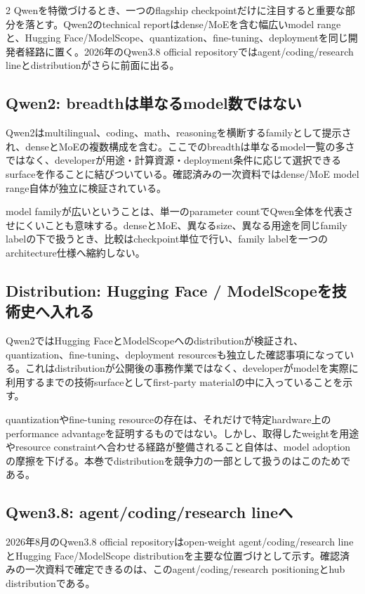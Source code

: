 \documentclass[lualatex,a4paper,10pt]{jlreq}
\begin{document}
\begin{multicols}{2}
\raggedcolumns
Qwenを特徴づけるとき、一つのflagship checkpointだけに注目すると重要な部分を落とす。Qwen2のtechnical reportはdense/MoEを含む幅広いmodel rangeと、Hugging Face/ModelScope、quantization、fine-tuning、deploymentを同じ開発者経路に置く。2026年のQwen3.8 official repositoryではagent/coding/research lineとdistributionがさらに前面に出る。\autocite{qwen2,qwen38}

\subsection{Qwen2: breadthは単なるmodel数ではない}
Qwen2はmultilingual、coding、math、reasoningを横断するfamilyとして提示され、denseとMoEの複数構成を含む。ここでのbreadthは単なるmodel一覧の多さではなく、developerが用途・計算資源・deployment条件に応じて選択できるsurfaceを作ることに結びついている。確認済みの一次資料ではdense/MoE model range自体が独立に検証されている。\autocite{qwen2}

model familyが広いということは、単一のparameter countでQwen全体を代表させにくいことも意味する。denseとMoE、異なるsize、異なる用途を同じfamily labelの下で扱うとき、比較はcheckpoint単位で行い、family labelを一つのarchitecture仕様へ縮約しない。

\subsection{Distribution: Hugging Face / ModelScopeを技術史へ入れる}
Qwen2ではHugging FaceとModelScopeへのdistributionが検証され、quantization、fine-tuning、deployment resourcesも独立した確認事項になっている。これはdistributionが公開後の事務作業ではなく、developerがmodelを実際に利用するまでの技術surfaceとしてfirst-party materialの中に入っていることを示す。\autocite{qwen2}

quantizationやfine-tuning resourceの存在は、それだけで特定hardware上のperformance advantageを証明するものではない。しかし、取得したweightを用途やresource constraintへ合わせる経路が整備されること自体は、model adoptionの摩擦を下げる。本巻でdistributionを競争力の一部として扱うのはこのためである。

\subsection{Qwen3.8: agent/coding/research lineへ}
2026年8月のQwen3.8 official repositoryはopen-weight agent/coding/research lineとHugging Face/ModelScope distributionを主要な位置づけとして示す。確認済みの一次資料で確定できるのは、このagent/coding/research positioningとhub distributionである。\autocite{qwen38}


\end{multicols}
\end{document}
